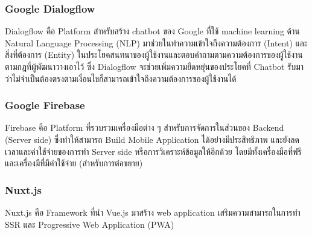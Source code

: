 \subsubsection{Google Dialogflow} 
\quad Dialogflow คือ Platform สำหรับสร้าง chatbot ของ Google ที่ใช้ machine learning ด้าน Natural Language Processing (NLP) มาช่วยในทำความเข้าใจถึงความต้องการ (Intent) และสิ่งที่ต้องการ (Entity) ในประโยคสนทนาของผู้ใช้งานและตอบคำถามตามความต้องการของผู้ใช้งาน ตามกฎที่ผู้พัฒนาวางเอาไว้ ซึ่ง Dialogflow จะช่วยเพิ่มความยืดหยุ่นของประโยคที่ Chatbot รับมา ว่าไม่จำเป็นต้องตรงตามเงื่อนไขก็สามารถเข้าใจถึงความต้องการของผู้ใช้งานได้ 
\cite{lineDf}
\subsubsection{Google Firebase} 
\quad Firebase คือ Platform ที่รวบรวมเครื่องมือต่าง ๆ สำหรับการจัดการในส่วนของ Backend (Server side) ซึ่งทำให้สามารถ Build Mobile Application ได้อย่างมีประสิทธิภาพ และยังลดเวลาและค่าใช้จ่ายของการทำ Server side หรือการวิเคราะห์ข้อมูลให้อีกด้วย โดยมีทั้งเครื่องมือที่ฟรี และเครื่องมีที่มีค่าใช้จ่าย (สำหรับการต่อขยาย) 
\cite{firebase}
\subsubsection{Nuxt.js }
\quad Nuxt.js คือ Framework ที่นำ Vue.js มาสร้าง web application เสริมความสามารถในการทำ SSR และ Progressive Web Application (PWA) 
\cite{nuxt}





